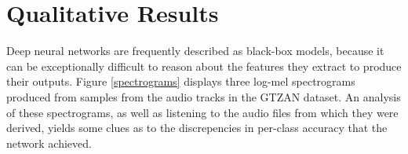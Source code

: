 \documentclass[conference]{IEEEtran}
\begin{document}
\section{Qualitative Results}

Deep neural networks are frequently described as black-box models, because it can be exceptionally difficult to reason about the features they extract to produce their outputs.
Figure \ref{spectrograms} displays three log-mel spectrograms produced from samples from the audio tracks in the GTZAN dataset.
An analysis of these spectrograms, as well as listening to the audio files from which they were derived, yields some clues as to the discrepencies in per-class accuracy that the network achieved.
\end{document}
